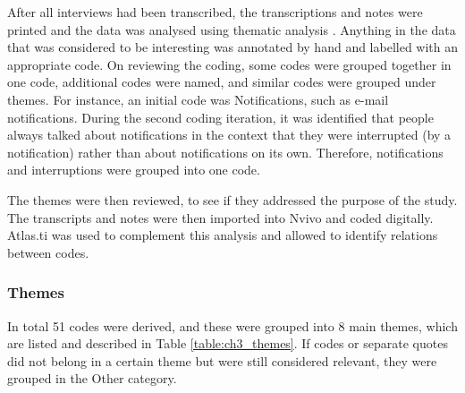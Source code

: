 \documentclass[11pt,oneside]{report}
\begin{document}
After all interviews had been transcribed, the transcriptions and notes were printed and the data was analysed using thematic analysis \citep{Braun2006}. Anything in the data that was considered to be interesting was annotated by hand and labelled with an appropriate code. On reviewing the coding, some codes were grouped together in one code, additional codes were named, and similar codes were grouped under themes. For instance, an initial code was Notifications, such as e-mail notifications. During the second coding iteration, it was identified that people always talked about notifications in the context that they were interrupted (by a notification) rather than about notifications on its own. Therefore, notifications and interruptions were grouped into one code. 

The themes were then reviewed, to see if they addressed the purpose of the study. The transcripts and notes were then imported into Nvivo and coded digitally. Atlas.ti was used to complement this analysis and allowed to identify relations between codes. 

\subsubsection{Themes}
In total 51 codes were derived, and these were grouped into 8 main themes, which are listed and described in Table \ref{table:ch3_themes}. If codes or separate quotes did not belong in a certain theme but were still considered relevant, they were grouped in the Other category. 
\end{document}
